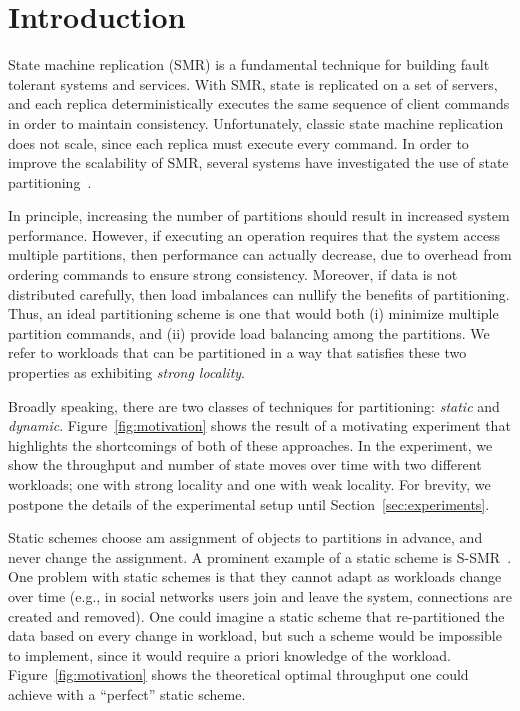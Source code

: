 \section{Introduction}

State machine replication (SMR) is a fundamental technique for
building fault tolerant systems and services. With SMR, state is
replicated on a set of servers, and each replica deterministically
executes the same sequence of client commands in order to maintain
consistency. Unfortunately, classic state machine replication does not
scale, since each replica must execute every command. In order to
improve the scalability of SMR, several systems have investigated the
use of state partitioning~\cite{facebookTAO, sciascia2012sdur,
  Aguilera:2007}.

In principle, increasing the number of partitions should result in
increased system performance. However, if executing an operation
requires that the system access multiple partitions, then performance
can actually decrease, due to overhead from ordering commands to
ensure strong consistency. Moreover, if data is not distributed
carefully, then load imbalances can nullify the benefits of
partitioning.  Thus, an ideal partitioning scheme is one that would
both (i) minimize multiple partition commands, and (ii) provide load
balancing among the partitions. We refer to workloads that can be
partitioned in a way that satisfies these two properties as exhibiting
\emph{strong locality}.

Broadly speaking, there are two classes of techniques for
partitioning: \emph{static} and \emph{dynamic}.
Figure~\ref{fig:motivation} shows the result of a motivating experiment
that highlights the shortcomings of both of these approaches. In
the experiment, we show the throughput and number of state moves
over time with two different workloads; one with strong locality
and one with weak locality. For brevity, we postpone the details
of the experimental setup until Section~\ref{sec:experiments}.

Static schemes choose am assignment of objects to partitions in
advance, and never change the assignment.  A prominent example of a
static scheme is S-SMR~\cite{ssmr}. One problem with static schemes is
that they cannot adapt as workloads change over time (e.g., in social
networks users join and leave the system, connections are created and
removed). One could imagine a static scheme that re-partitioned the
data based on every change in workload, but such a scheme would be
impossible to implement, since it would require a priori knowledge of
the workload. Figure~\ref{fig:motivation} shows the theoretical
optimal throughput one could achieve with a ``perfect'' static scheme.


